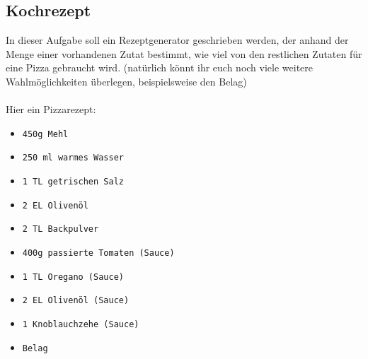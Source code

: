 \subsection{Kochrezept}
In dieser Aufgabe soll ein Rezeptgenerator geschrieben werden, der anhand der Menge einer vorhandenen Zutat bestimmt, wie viel von den restlichen Zutaten für eine Pizza gebraucht wird. (natürlich könnt ihr euch noch viele weitere Wahlmöglichkeiten überlegen, beispielsweise den Belag) \\
\\
Hier ein Pizzarezept: \\
\begin{multicols}{2}
    \begin{itemize}
        \item \texttt{450g Mehl}
        \item \texttt{250 ml warmes Wasser}
        \item \texttt{1 TL getrischen Salz}
        \item \texttt{2 EL Olivenöl}
        \item \texttt{2 TL Backpulver}
        \item \texttt{400g passierte Tomaten (Sauce)}
        \item \texttt{1 TL Oregano (Sauce)}
        \item \texttt{2 EL Olivenöl (Sauce)}
        \item \texttt{1 Knoblauchzehe (Sauce)}
        \item \texttt{Belag}
    \end{itemize}
\end{multicols}
